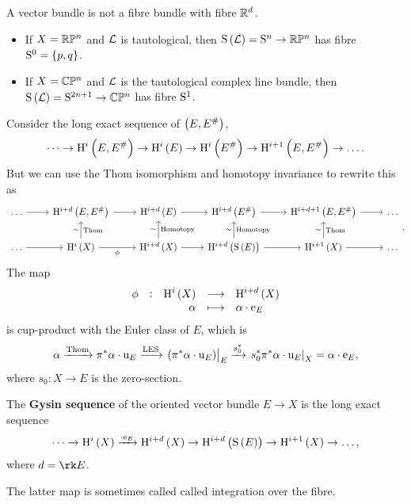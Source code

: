\pagebreak

\begin{remark*}
A vector bundle is not a fibre bundle with fibre $ \RR^d $.
\end{remark*}

\begin{example*}
\hfill
\begin{itemize}
\item If $ X = \RR\PP^n $ and $ \LLL $ is tautological, then $ \S\br{\LLL} = \S^n \to \RR\PP^n $ has fibre $ \S^0 = \cbr{p, q} $.
\item If $ X = \CC\PP^n $ and $ \LLL $ is the tautological complex line bundle, then $ \S\br{\LLL} = \S^{2n + 1} \to \CC\PP^n $ has fibre $ \S^1 $.
\end{itemize}
\end{example*}

Consider the long exact sequence of $ \br{E, E^\#} $,
$$ \dots \to \H^i\br{E, E^\#} \to \H^i\br{E} \to \H^i\br{E^\#} \to \H^{i + 1}\br{E, E^\#} \to \dots. $$
But we can use the Thom isomorphism and homotopy invariance to rewrite this as
$$
\begin{tikzcd}
\dots \arrow{r} & \H^{i + d}\br{E, E^\#} \arrow{r} & \H^{i + d}\br{E} \arrow{r} & \H^{i + d}\br{E^\#} \arrow{r} & \H^{i + d + 1}\br{E, E^\#} \arrow{r} & \dots \\
\dots \arrow{r} & \H^i\br{X} \arrow{u}{\sim}[swap]{\text{Thom}} \arrow{r}[swap]{\phi} & \H^{i + d}\br{X} \arrow{u}{\sim}[swap]{\text{Homotopy}} \arrow{r} & \H^{i + d}\br{\S\br{E}} \arrow{u}{\sim}[swap]{\text{Homotopy}} \arrow{r} & \H^{i + 1}\br{X} \arrow{u}{\sim}[swap]{\text{Thom}} \arrow{r} & \dots
\end{tikzcd}.
$$
The map
$$ \function[\phi]{\H^i\br{X}}{\H^{i + d}\br{X}}{\alpha}{\alpha \cdot \e_E} $$
is cup-product with the Euler class of $ E $, which is
$$ \alpha \xrightarrow{\text{Thom}} \pi^*\alpha \cdot \u_E \xrightarrow{\text{LES}} \eval{\br{\pi^*\alpha \cdot \u_E}}_E \xrightarrow{s_0^*} \eval{s_0^*\pi^*\alpha \cdot \u_E}_X = \alpha \cdot \e_E, $$
where $ s_0 : X \to E $ is the zero-section.

\begin{definition*}
The \textbf{Gysin sequence} of the oriented vector bundle $ E \to X $ is the long exact sequence
$$ \dots \to \H^i\br{X} \xrightarrow{\cdot \e_E} \H^{i + d}\br{X} \to \H^{i + d}\br{\S\br{E}} \to \H^{i + 1}\br{X} \to \dots, $$
where $ d = \rk E $.
\end{definition*}

The latter map is sometimes called called integration over the fibre.

